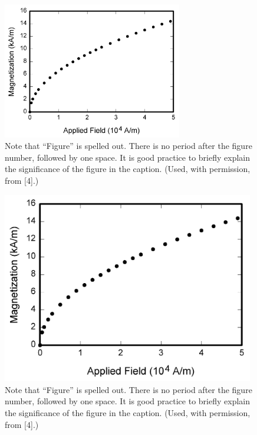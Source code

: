 \documentclass[]{IEEEibm}
\begin{document}
\begin{figure}
\centerline{\includegraphics[width=18.5pc]{fig1.png}}
\caption{Note that ``Figure'' is spelled out. There is no period after the figure number, followed by one space. It is good practice to briefly explain the significance of the figure in the caption. (Used, with permission, from [4].)}
\end{figure}

\begin{figure}
\centerline{\includegraphics[width=26pc]{fig1.png}}
\caption{Note that ``Figure'' is spelled out. There is no period after the figure number, followed by one space. It is good practice to briefly explain the significance of the figure in the caption. (Used, with permission, from [4].)}
\end{figure}
\end{document}
